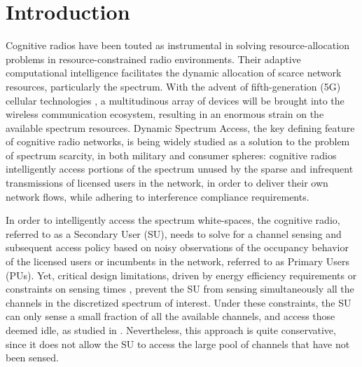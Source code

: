 \documentclass[10pt, twocolumn]{IEEEtran}
\begin{document}
\section{Introduction}\label{O}
Cognitive radios have been touted as instrumental in solving resource-allocation problems in resource-constrained radio environments. Their adaptive computational intelligence facilitates the dynamic allocation of scarce network resources, particularly the spectrum. With the advent of fifth-generation (5G) cellular technologies \cite{Ericsson:5Gusecases, WSJ:5Gdominance}, a multitudinous array of devices will be brought into the wireless communication ecosystem, resulting in an enormous strain on the available spectrum resources. Dynamic Spectrum Access, the key defining feature of cognitive radio networks, is being widely studied as a solution to the problem of spectrum scarcity, in both military and consumer spheres: cognitive radios intelligently access portions of the spectrum unused by the sparse and infrequent transmissions of licensed users in the network, in order to deliver their own network flows, while adhering to
interference compliance requirements.

In order to intelligently access the spectrum white-spaces, the
cognitive radio, referred to as a Secondary User (SU), needs to solve for a channel sensing and subsequent access policy based on noisy observations of the occupancy behavior of the licensed users or incumbents in the network, referred to as Primary Users (PUs). Yet, critical design limitations, driven by energy efficiency requirements or constraints on sensing times \cite{WCL:3}, prevent the SU from sensing simultaneously all the channels in the discretized spectrum of interest. Under these constraints, the SU can only sense a small fraction of all the available channels, and access those deemed idle, as studied in \cite{WCL:3, WCL:4, WCL:5, WCL:6, WCL:8, WCL:9, WCL:10, WCL:11}. Nevertheless, this approach is quite conservative, since it does not allow the SU to access the large pool of channels that have not been sensed.
\end{document}
